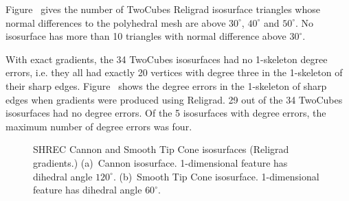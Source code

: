 Figure~ gives
the number of TwoCubes Religrad isosurface triangles 
whose normal differences to the polyhedral mesh 
are above $30^\circ$, $40^\circ$ and $50^\circ$.
No isosurface has more than 10 triangles with normal difference
above $30^\circ$.

With exact gradients, the 34 TwoCubes isosurfaces 
had no 1-skeleton degree errors, 
i.e. they all had exactly 20 vertices with degree three 
in the 1-skeleton of their sharp edges.
Figure~ shows
the degree errors in the 1-skeleton of sharp edges
when gradients were produced using Religrad.
29 out of the 34 TwoCubes isosurfaces had no degree errors.
Of the 5 isosurfaces with degree errors,
the maximum number of degree errors was four.

\begin{figure}[t]
\caption{SHREC Cannon and Smooth Tip Cone isosurfaces (Religrad gradients.) 
(a)~Cannon isosurface.
\mbox{1-dimensional} feature has dihedral angle $120^\circ$.
(b)~Smooth Tip Cone isosurface.  1-dimensional feature has dihedral angle $60^\circ$.}
\label{fig:cannon_cone}
\end{figure}

